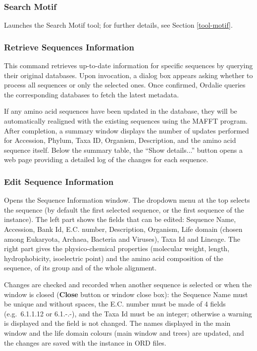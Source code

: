 \documentclass[a4paper]{article}
\begin{document}
\subsubsection{Search Motif}
Launches the Search Motif tool; for further details, see Section \ref{tool-motif}.

\subsubsection{Retrieve Sequences Information}
\label{tool-inforetrieve}
This command retrieves up-to-date information for specific sequences by querying their original databases. Upon invocation, a dialog box appears asking whether to process all sequences or only the selected ones. Once confirmed, Ordalie queries the corresponding databases to fetch the latest metadata. 

If any amino acid sequences have been updated in the database, they will be automatically realigned with the existing sequences using the MAFFT program. After completion, a summary window displays the number of updates performed for Accession, Phylum, Taxa ID, Organism, Description, and the amino acid sequence itself. Below the summary table, the ``Show details...'' button opens a web page providing a detailed log of the changes for each sequence.

\subsubsection{Edit Sequence Information}
\label{tool-editinfoseq}
Opens the Sequence Information window. The dropdown menu at the top selects the sequence (by default the first selected sequence, or the first sequence of the instance). The left part shows the fields that can be edited: Sequence Name, Accession, Bank Id, E.C. number, Description, Organism, Life domain (chosen among Eukaryota, Archaea, Bacteria and Viruses), Taxa Id and Lineage. The right part gives the physico-chemical properties (molecular weight, length, hydrophobicity, isoelectric point) and the amino acid composition of the sequence, of its group and of the whole alignment.

Changes are checked and recorded when another sequence is selected or when the window is closed (\textbf{Close} button or window close box): the Sequence Name must be unique and without spaces, the E.C. number must be made of 4 fields (e.g.\ 6.1.1.12 or 6.1.-.-), and the Taxa Id must be an integer; otherwise a warning is displayed and the field is not changed. The names displayed in the main window and the life domain colours (main window and trees) are updated, and the changes are saved with the instance in ORD files.
\end{document}
